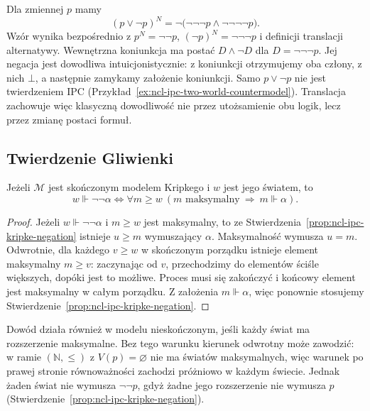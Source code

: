 \begin{przyklad}
\label{ex:ncl-ipc-negative-lem}
Dla zmiennej $p$ mamy
\[
 (p\vee\neg p)^N=
 \neg\bigl(\neg\neg\neg p\wedge
                  \neg\neg\neg\neg p\bigr).
\]
Wzór wynika bezpośrednio z
$p^N=\neg\neg p$, $(\neg p)^N=\neg\neg\neg p$
i definicji translacji alternatywy.
Wewnętrzna koniunkcja ma postać $D\wedge\neg D$
dla $D=\neg\neg\neg p$. Jej negacja jest
dowodliwa intuicjonistycznie: z koniunkcji
otrzymujemy oba człony, z nich $\bot$, a następnie
zamykamy założenie koniunkcji.
Samo $p\vee\neg p$ nie jest twierdzeniem IPC
(Przykład~\ref{ex:ncl-ipc-two-world-countermodel}).
Translacja zachowuje więc klasyczną dowodliwość
nie przez utożsamienie obu logik, lecz przez
zmianę postaci formuł.
\end{przyklad}

\subsection{Twierdzenie Gliwienki}

\begin{lemat}
\label{lem:ncl-ipc-finite-maximal-negation}
Jeżeli $\mathcal M$ jest skończonym modelem Kripkego
i $w$ jest jego światem, to
\[
 w\Vdash\neg\neg\alpha
 \iff \forall m\geq w\
 (m\text{ maksymalny}\ \Longrightarrow\ m\Vdash\alpha).
\]
\end{lemat}
\begin{proof}
Jeżeli $w\Vdash\neg\neg\alpha$ i $m\geq w$ jest
maksymalny, to ze Stwierdzenia~\ref{prop:ncl-ipc-kripke-negation}
istnieje $u\geq m$ wymuszający $\alpha$. Maksymalność
wymusza $u=m$.
Odwrotnie, dla każdego $v\geq w$ w skończonym porządku
istnieje element maksymalny $m\geq v$: zaczynając od
$v$, przechodzimy do elementów ściśle większych, dopóki
jest to możliwe. Proces musi się zakończyć i końcowy
element jest maksymalny w całym porządku. Z założenia
$m\Vdash\alpha$, więc ponownie stosujemy
Stwierdzenie~\ref{prop:ncl-ipc-kripke-negation}.
\end{proof}
Dowód działa również w modelu nieskończonym, jeśli
każdy świat ma rozszerzenie maksymalne. Bez tego
warunku kierunek odwrotny może zawodzić:
w ramie $(\mathbb N,\leq)$ z $V(p)=\varnothing$
nie ma światów maksymalnych, więc warunek po prawej
stronie równoważności zachodzi próżniowo w każdym
świecie. Jednak żaden świat nie wymusza
$\neg\neg p$, gdyż żadne jego rozszerzenie nie
wymusza $p$
(Stwierdzenie~\ref{prop:ncl-ipc-kripke-negation}).


